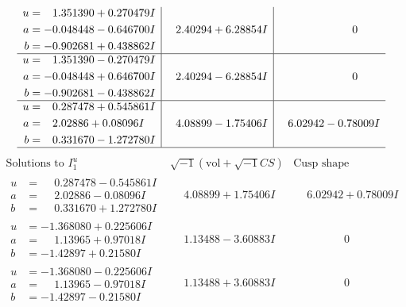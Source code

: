 \documentclass[1p]{elsarticle_modified}
\theoremstyle{definition}
\newcommand{\I}{\sqrt{-1}}
\begin{document}
$$\begin{array}{c|c|c}
\begin{aligned}
u &= \phantom{-}1.351390 + 0.270479 I \\
a &= -0.048448 - 0.646700 I \\
b &= -0.902681 + 0.438862 I\end{aligned}
 & \phantom{-}2.40294 + 6.28854 I & \phantom{-0.000000 } 0 \\ \hline\begin{aligned}
u &= \phantom{-}1.351390 - 0.270479 I \\
a &= -0.048448 + 0.646700 I \\
b &= -0.902681 - 0.438862 I\end{aligned}
 & \phantom{-}2.40294 - 6.28854 I & \phantom{-0.000000 } 0 \\ \hline\begin{aligned}
u &= \phantom{-}0.287478 + 0.545861 I \\
a &= \phantom{-}2.02886 + 0.08096 I \\
b &= \phantom{-}0.331670 - 1.272780 I\end{aligned}
 & \phantom{-}4.08899 - 1.75406 I & \phantom{-}6.02942 - 0.78009 I\\
 \hline 
 \end{array}$$\newpage$$\begin{array}{c|c|c}  
\text{Solutions to }I^u_{1}& \I (\text{vol} + \sqrt{-1}CS) & \text{Cusp shape}\\
 \hline 
\begin{aligned}
u &= \phantom{-}0.287478 - 0.545861 I \\
a &= \phantom{-}2.02886 - 0.08096 I \\
b &= \phantom{-}0.331670 + 1.272780 I\end{aligned}
 & \phantom{-}4.08899 + 1.75406 I & \phantom{-}6.02942 + 0.78009 I \\ \hline\begin{aligned}
u &= -1.368080 + 0.225606 I \\
a &= \phantom{-}1.13965 + 0.97018 I \\
b &= -1.42897 + 0.21580 I\end{aligned}
 & \phantom{-}1.13488 - 3.60883 I & \phantom{-0.000000 } 0 \\ \hline\begin{aligned}
u &= -1.368080 - 0.225606 I \\
a &= \phantom{-}1.13965 - 0.97018 I \\
b &= -1.42897 - 0.21580 I\end{aligned}
 & \phantom{-}1.13488 + 3.60883 I & \phantom{-0.000000 } 0 \\ \hline\begin{aligned}

\end{aligned}
\end{array}$$
\end{document}
